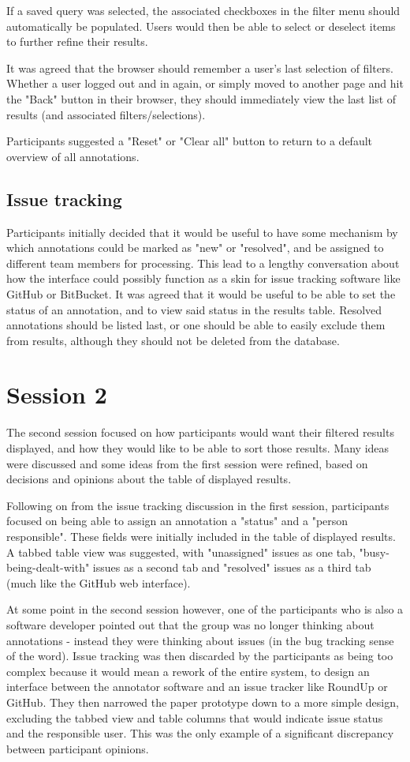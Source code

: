 If a saved query was selected, the associated checkboxes in the filter menu should automatically be populated. Users would then be able to select or deselect items to further refine their results.

It was agreed that the browser should remember a user's last selection of filters. Whether a user logged out and in again, or simply moved to another page and hit the "Back" button in their browser, they should immediately view the last list of results (and associated filters/selections).

Participants suggested a "Reset" or "Clear all" button to return to a default overview of all annotations. 

\subsection{Issue tracking}
Participants initially decided that it would be useful to have some mechanism by which annotations could be marked as "new" or "resolved", and be assigned to different team members for processing. This lead to a lengthy conversation about how the interface could possibly function as a skin for issue tracking software like GitHub or BitBucket. It was agreed that it would be useful to be able to set the status of an annotation, and to view said status in the results table. Resolved annotations should be listed last, or one should be able to easily exclude them from results, although they should not be deleted from the database.

\section{Session 2}
The second session focused on how participants would want their filtered results displayed, and how they would like to be able to sort those results. Many ideas were discussed and some ideas from the first session were refined, based on decisions and opinions about the table of displayed results. 

Following on from the issue tracking discussion in the first session, participants focused on being able to assign an annotation a "status" and a "person responsible". These fields were initially included in the table of displayed results. A tabbed table view was suggested, with "unassigned" issues as one tab, "busy-being-dealt-with" issues as a second tab and "resolved" issues as a third tab (much like the GitHub web interface). 

At some point in the second session however, one of the participants who is also a software developer pointed out that the group was no longer thinking about annotations - instead they were thinking about issues (in the bug tracking sense of the word). Issue tracking was then discarded by the participants as being too complex because it would mean a rework of the entire system, to design an interface between the annotator software and an issue tracker like RoundUp or GitHub. They then narrowed the paper prototype down to a more simple design, excluding the tabbed view and table columns that would indicate issue status and the responsible user. This was the only example of a significant discrepancy between participant opinions. 

